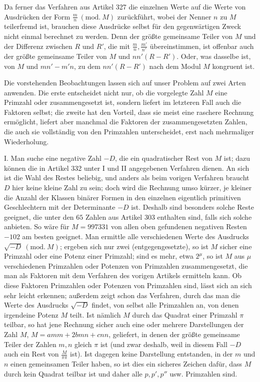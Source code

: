 Da ferner das Verfahren aus Artikel 327 die einzelnen Werte auf die Werte von Ausdrücken der Form \(\frac mn\ (\mathrm{mod.}\ M)\) zurückführt, wobei der Nenner \(n\) zu \(M\) teilerfremd ist, brauchen diese Ausdrücke selbst für den gegenwärtigen Zweck nicht einmal berechnet zu werden. Denn der größte gemeinsame Teiler von \(M\) und der Differenz zwischen \(R\) und \(R'\), die mit \(\frac mn,\allowbreak \frac{m'}{n'}\) übereinstimmen, ist offenbar auch der größte gemeinsame Teiler von \(M\) und \(nn'(R-R')\). Oder, was dasselbe ist, von \(M\) und \(mn'-m'n\), zu dem \(nn'(R-R')\) nach dem Modul \(M\) kongruent ist.

Die vorstehenden Beobachtungen lassen sich auf unser Problem auf zwei Arten anwenden. Die erste entscheidet nicht nur, ob die vorgelegte Zahl \(M\) eine Primzahl oder zusammengesetzt ist, sondern liefert im letzteren Fall auch die Faktoren selbst; die zweite hat den Vorteil, dass sie meist eine raschere Rechnung ermöglicht, liefert aber manchmal die Faktoren der zusammengesetzten Zahlen, die auch sie vollständig von den Primzahlen unterscheidet, erst nach mehrmaliger Wiederholung.

I. Man suche eine negative Zahl \(-D\), die ein quadratischer Rest von \(M\) ist; dazu können die in Artikel 332 unter I und II angegebenen Verfahren dienen. An sich ist die Wahl des Restes beliebig, und anders als beim vorigen Verfahren braucht \(D\) hier keine kleine Zahl zu sein; doch wird die Rechnung umso kürzer, je kleiner die Anzahl der Klassen binärer Formen in den einzelnen eigentlich primitiven Geschlechtern mit der Determinante \(-D\) ist. Deshalb sind besonders solche Reste geeignet, die unter den \(65\) Zahlen aus Artikel 303 enthalten sind, falls sich solche anbieten. So wäre für \(M=997331\) von allen oben gefundenen negativen Resten \(-102\) am besten
geeignet. Man ermittle alle verschiedenen Werte des Ausdrucks \(\surd{-D}\ (\mathrm{mod.}\ M)\); ergeben sich nur zwei (entgegengesetzte), so ist \(M\) sicher eine Primzahl oder eine Potenz einer Primzahl; sind es mehr, etwa \(2^\mu\), so ist \(M\) aus \(\mu\) verschiedenen Primzahlen oder Potenzen von Primzahlen zusammengesetzt, die man als Faktoren mit dem Verfahren des vorigen Artikels ermitteln kann. Ob diese Faktoren Primzahlen oder Potenzen von Primzahlen sind, lässt sich an sich sehr leicht erkennen; außerdem zeigt schon das Verfahren, durch das man die Werte des Ausdrucks \(\surd{-D}\) findet, von selbst alle Primzahlen an, von denen irgendeine Potenz \(M\) teilt. Ist nämlich \(M\) durch das Quadrat einer Primzahl \(\pi\) teilbar, so hat jene Rechnung sicher auch eine oder mehrere Darstellungen der Zahl \(M\), \(M=amm+2bmn+cnn\), geliefert, in denen der größte gemeinsame Teiler der Zahlen \(m,\allowbreak n\) gleich \(\pi\) ist (und zwar deshalb, weil in diesem Fall \(-D\) auch ein Rest von \(\frac{M}{\pi\pi}\) ist). Ist dagegen keine Darstellung entstanden, in der \(m\) und \(n\) einen gemeinsamen Teiler haben, so ist dies ein sicheres Zeichen dafür, dass \(M\) durch kein Quadrat teilbar ist und daher alle \(p,\allowbreak p',\allowbreak p''\) usw. Primzahlen sind.


